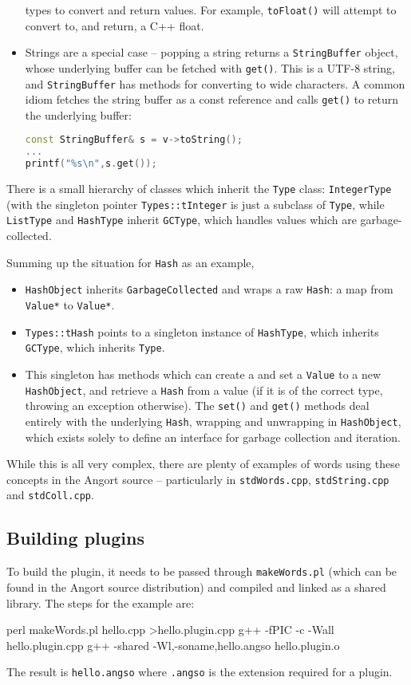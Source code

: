 \begin{itemize}
types to convert and return values. For example, \texttt{toFloat()} will
attempt to convert to, and return, a C++ float.
\item Strings are a special case -- popping a string returns a
\texttt{StringBuffer} object, whose underlying buffer can be fetched
with \texttt{get()}. This is a UTF-8 string, and \texttt{StringBuffer} 
has methods for converting to wide characters. A common idiom fetches
the string buffer as a const reference and calls \texttt{get()} to
return the underlying buffer:
\begin{lstlisting}[language=c++]
const StringBuffer& s = v->toString();
...
printf("%s\n",s.get());
\end{lstlisting}
\end{itemize}

There is a small hierarchy of classes which inherit the \texttt{Type} class:
\texttt{IntegerType} (with the singleton pointer \texttt{Types::tInteger} is
just a subclass of \texttt{Type}, while \texttt{ListType} and
\texttt{HashType} inherit \texttt{GCType}, which handles values which
are garbage-collected.

Summing up the situation for \texttt{Hash} as an example,
\begin{itemize}
\item \texttt{HashObject} inherits \texttt{GarbageCollected} and
wraps a raw \texttt{Hash}: a map from \texttt{Value*} to
\texttt{Value*}.
\item \texttt{Types::tHash} points to a singleton instance of
\texttt{HashType}, which inherits \texttt{GCType}, which inherits
\texttt{Type}.
\item This singleton has methods which can create a and
set a \texttt{Value} to a new \texttt{HashObject},
and retrieve a \texttt{Hash} from a value (if it is of the correct type, throwing
an exception otherwise). The \texttt{set()} and \texttt{get()} methods
deal entirely with the underlying \texttt{Hash}, wrapping and unwrapping
in \texttt{HashObject}, which exists solely to define an
interface for garbage collection and iteration.
\end{itemize}
While this is all very complex, there are plenty of examples of words
using these concepts in the Angort source --
particularly in \texttt{stdWords.cpp}, \texttt{stdString.cpp} and
\texttt{stdColl.cpp}.




\subsection{Building plugins}
To build the plugin, it needs to be passed through \texttt{makeWords.pl} 
(which can be found in the Angort source distribution) and compiled and linked as
a shared library. The steps for the example are:
\begin{v}
perl makeWords.pl hello.cpp >hello.plugin.cpp
g++ -fPIC -c -Wall hello.plugin.cpp
g++ -shared -Wl,-soname,hello.angso hello.plugin.o
\end{v}
The result is \texttt{hello.angso} where \texttt{.angso} is the extension
required for a plugin.


